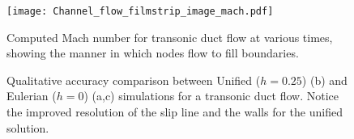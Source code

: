 \begin{figure}[p]
  \centering
  \texttt{[image: Channel\_flow\_filmstrip\_image\_mach.pdf]} 
  \caption[Time-Lapse Images of Transonic Duct Flow]{Computed Mach
    number for transonic duct flow at various times, showing the
    manner in which nodes flow to fill boundaries.}
  \label{fig:shock-train-channel-flow-filmstrip}
\end{figure}

\begin{figure}[htbp]
   \centering
   \begin{subfigmatrix}{2}
   \end{subfigmatrix}
   \caption[Accuracy Comparison Between Moving and Stationary
   grids]{Qualitative accuracy comparison between Unified ($h=0.25$)
     (b) and Eulerian ($h=0$) (a,c) simulations for a transonic duct
     flow. Notice the improved resolution of the slip line and the
     walls for the unified solution.}
   \label{fig:duct-verification}
\end{figure}

